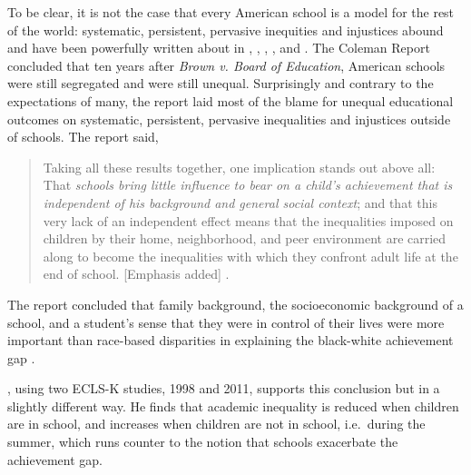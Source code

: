 To be clear, it is not the case that every American school is a model for the
rest of the world: systematic, persistent, pervasive inequities and injustices
abound and have been powerfully written about in \textcite{Kozol1992}, \textcite{Valenzuela1999}, \textcite{Kozol2005}, \textcite{Heitzeg2009}, and \textcite{Roithmayr2021}. The Coleman Report \parencite{Coleman1966} concluded that ten years after \textit{Brown v. Board of Education}, American schools were still segregated and were still unequal. Surprisingly and contrary to the expectations of many, the report laid most of the blame for unequal educational outcomes on systematic, persistent, pervasive inequalities and injustices outside of schools. The report said,
\begin{quotation}\noindent
  Taking all these results together, one implication stands out above all: That \textit{schools bring little influence to bear on a child's achievement that is independent of his background and general social context}; and that this very lack of an independent effect means that the inequalities imposed on children by their home, neighborhood, and peer environment are carried along to become the inequalities with which they confront adult life at the end of school. [Emphasis added] \parencite[325]{Coleman1966}.
\end{quotation}
The report concluded that family background, the socioeconomic background of a school, and a student's sense that they were in control of their lives were more important than race-based disparities in explaining the black-white achievement gap \parencite{Pearce2016}.

 \textcite{Downey2020}, using two ECLS-K studies, 1998 and 2011, supports this conclusion but in a slightly different way. He finds that academic inequality is reduced when children are in school, and increases when children are not in school, i.e.~during the summer, which runs counter to the notion that schools exacerbate the achievement gap.

